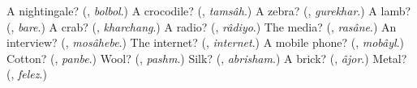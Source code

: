\begin{tcolorbox}[breakable,colback=teal!4,colframe=teal!35!black,title={Before you move on}]
A nightingale? (\textbf{}, \emph{bolbol}.) A crocodile? (\textbf{}, \emph{tamsâh}.) A zebra? (\textbf{}, \emph{gurekhar}.) A lamb? (\textbf{}, \emph{bare}.) A crab? (\textbf{}, \emph{kharchang}.) A radio? (\textbf{}, \emph{râdiyo}.) The media? (\textbf{}, \emph{rasâne}.) An interview? (\textbf{}, \emph{mosâhebe}.) The internet? (\textbf{}, \emph{internet}.) A mobile phone? (\textbf{}, \emph{mobâyl}.) Cotton? (\textbf{}, \emph{panbe}.) Wool? (\textbf{}, \emph{pashm}.) Silk? (\textbf{}, \emph{abrisham}.) A brick? (\textbf{}, \emph{âjor}.) Metal? (\textbf{}, \emph{felez}.)
\end{tcolorbox}
